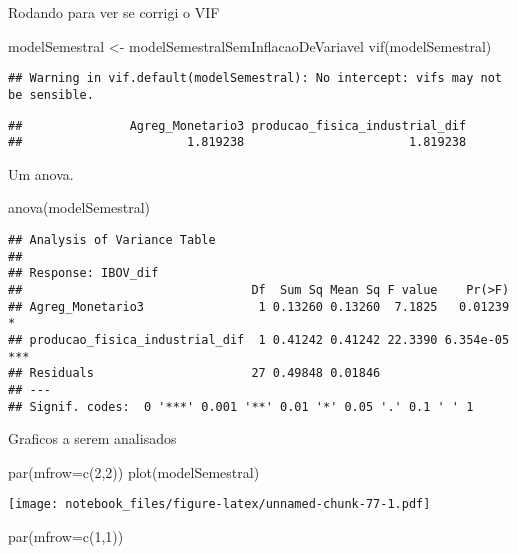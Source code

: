 \documentclass[
]{article}
\newenvironment{Shaded}{\begin{snugshade}}{\end{snugshade}}
\newcommand{\AttributeTok}[1]{\textcolor[rgb]{0.77,0.63,0.00}{#1}}
\newcommand{\DecValTok}[1]{\textcolor[rgb]{0.00,0.00,0.81}{#1}}
\newcommand{\FunctionTok}[1]{\textcolor[rgb]{0.00,0.00,0.00}{#1}}
\newcommand{\NormalTok}[1]{#1}
\newcommand{\OtherTok}[1]{\textcolor[rgb]{0.56,0.35,0.01}{#1}}
\begin{document}
Rodando para ver se corrigi o VIF

\begin{Shaded}
\begin{Highlighting}[]
\NormalTok{modelSemestral }\OtherTok{\textless{}{-}}\NormalTok{ modelSemestralSemInflacaoDeVariavel}
\FunctionTok{vif}\NormalTok{(modelSemestral)}
\end{Highlighting}
\end{Shaded}

\begin{verbatim}
## Warning in vif.default(modelSemestral): No intercept: vifs may not be sensible.
\end{verbatim}

\begin{verbatim}
##               Agreg_Monetario3 producao_fisica_industrial_dif 
##                       1.819238                       1.819238
\end{verbatim}

Um anova.

\begin{Shaded}
\begin{Highlighting}[]
\FunctionTok{anova}\NormalTok{(modelSemestral)}
\end{Highlighting}
\end{Shaded}

\begin{verbatim}
## Analysis of Variance Table
## 
## Response: IBOV_dif
##                                Df  Sum Sq Mean Sq F value    Pr(>F)    
## Agreg_Monetario3                1 0.13260 0.13260  7.1825   0.01239 *  
## producao_fisica_industrial_dif  1 0.41242 0.41242 22.3390 6.354e-05 ***
## Residuals                      27 0.49848 0.01846                      
## ---
## Signif. codes:  0 '***' 0.001 '**' 0.01 '*' 0.05 '.' 0.1 ' ' 1
\end{verbatim}

Graficos a serem analisados

\begin{Shaded}
\begin{Highlighting}[]
\FunctionTok{par}\NormalTok{(}\AttributeTok{mfrow=}\FunctionTok{c}\NormalTok{(}\DecValTok{2}\NormalTok{,}\DecValTok{2}\NormalTok{))}
\FunctionTok{plot}\NormalTok{(modelSemestral)}
\end{Highlighting}
\end{Shaded}

\texttt{[image: notebook\_files/figure-latex/unnamed-chunk-77-1.pdf]}

\begin{Shaded}
\begin{Highlighting}[]
\FunctionTok{par}\NormalTok{(}\AttributeTok{mfrow=}\FunctionTok{c}\NormalTok{(}\DecValTok{1}\NormalTok{,}\DecValTok{1}\NormalTok{))}
\end{Highlighting}
\end{Shaded}
\end{document}
